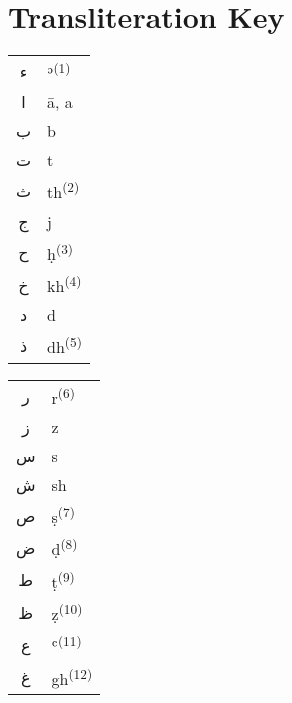 \documentclass[ebook]{memoir}
\begin{document}
\chapter*{Transliteration Key}
\vspace{-2.3em}
\thispagestyle{empty}

\begin{table}[!h]
{\def\arraystretch{1.2}\tabcolsep=5pt
\begin{tabular}{@{}cl@{}}
\textarabic{ء} & {\large ʾ}\textsuperscript{(1)}\\
\textarabic{ا} & {\large ā, a}\\
\textarabic{ب} & {\large b}\\
\textarabic{ت} & {\large t}\\
\textarabic{ث} & {\large th}\textsuperscript{(2)}\\
\textarabic{ج} & {\large j}\\
\textarabic{ح} & {\large ḥ}\textsuperscript{(3)}\\
\textarabic{خ} & {\large kh}\textsuperscript{(4)}\\
\textarabic{د} & {\large d}\\
\textarabic{ذ} & {\large dh}\textsuperscript{(5)}\\
\end{tabular}}
\hfill
{\def\arraystretch{1.2}\tabcolsep=5pt
	\begin{tabular}{@{}cl@{}}
\textarabic{ر} & {\large r}\textsuperscript{(6)}\\
\textarabic{ز} & {\large z}\\
\textarabic{س} & {\large s}\\
\textarabic{ش} & {\large sh}\\
\textarabic{ص} & {\large ṣ}\textsuperscript{(7)}\\
\textarabic{ض} & {\large ḍ}\textsuperscript{(8)}\\
\textarabic{ط} & {\large ṭ}\textsuperscript{(9)}\\
\textarabic{ظ} & {\large ẓ}\textsuperscript{(10)}\\
\textarabic{ع} & {\large ʿ}\textsuperscript{(11)}\\
\textarabic{غ} & {\large gh}\textsuperscript{(12)}\\
\end{tabular}}
\hfill
{\def\arraystretch{1.2}\tabcolsep=5pt
\begin{tabular}{@{}cl@{}}

\end{tabular}}
\end{table}
\end{document}
